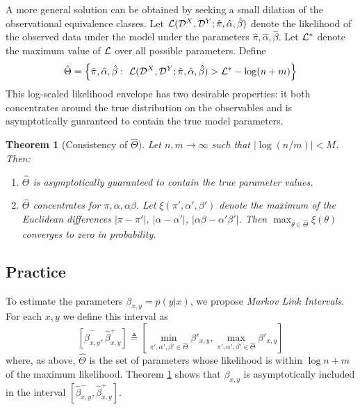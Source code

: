 \documentclass{article}
\newtheorem{thm}{Theorem}
\theoremstyle{definition}
\begin{document}
A more general solution can be obtained by seeking a small dilation of the observational equivalence classes.  Let $\mathcal{L}(\mathcal{D}^X,\mathcal{D}^Y;\hat \pi,\hat \alpha,\hat \beta)$ denote the likelihood of the observed data under the model under the parameters $\hat \pi,\hat \alpha,\hat \beta$.  Let $\mathcal{L}^*$ denote the maximum value of $\mathcal{L}$ over all possible parameters.  Define
\begin{gather}
\hat \Theta=\left\{\hat \pi, \hat \alpha,\hat \beta:\ \mathcal{L}(\mathcal{D}^X,\mathcal{D}^Y;\hat \pi,\hat \alpha,\hat \beta) > \mathcal{L}^* - \log(n+m)\right\} \label{eq:magictheta}
\end{gather}
This log-scaled likelihood envelope has two desirable properties: it both concentrates around the true distribution on the observables and is asymptotically guaranteed to contain the true model parameters.
\begin{thm}[Consistency of $\hat \Theta$]\label{thm:consistency} Let $n,m\rightarrow\infty$ such that $|\log(n/m)|<M$.  Then:
\begin{enumerate}
    \item $\hat \Theta$ is asymptotically guaranteed to contain the true parameter values.  
    \item $\hat \Theta$ concentrates for $\pi,\alpha,\alpha\beta$. Let $\xi(\pi',\alpha',\beta')$ denote the maximum of the Euclidean differences $|\pi-\pi'|$, $|\alpha-\alpha'|$, $|\alpha\beta-\alpha'\beta'|$.  Then $\max_{\theta \in \hat \Theta} \xi(\theta)$ converges to zero in probability.   
\end{enumerate}
\end{thm}

\subsection{Practice}

To estimate the parameters $\beta_{x,y} = p(y|x)$, we propose \emph{Markov Link Intervals}.  For each $x,y$ we define this interval as 
\[
[\hat \beta^-_{x,y},\hat \beta^+_{x,y}] \triangleq \left[\min_{\pi',\alpha',\beta' \in \hat \Theta} \beta'_{x,y},\max_{\pi',\alpha',\beta' \in \hat \Theta}\beta'_{x,y}\right]
\]  
where, as above, $\hat \Theta$ is the set of parameters whose likelihood is within $\log n+m$ of the maximum likelihood.  Theorem \ref{thm:consistency} shows that $\beta_{x,y}$ is asymptotically included in the interval $[\hat \beta^-_{x,y},\hat \beta^+_{x,y}]$.  
\end{document}
